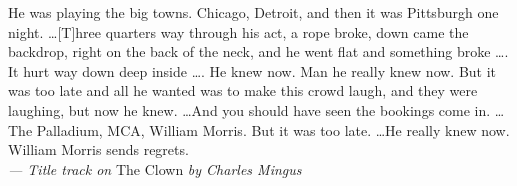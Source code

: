 %
%
%


%
%

\begin{flushright}
  \begin{minipage}[]{0.6\linewidth}
    \begin{flushright}
      He was playing the big towns. Chicago, Detroit, and then it was Pittsburgh
      one night. \dots [T]hree quarters way through his act, a rope broke, down
      came the backdrop, right on the back of the neck, and he went flat and
      something broke \dots . It hurt way down deep inside \dots . He knew
      now. Man he really knew now. But it was too late and all he wanted was to
      make this crowd laugh, and they were laughing, but now he knew. \dots And
      you should have seen the bookings come in. \dots The Palladium, MCA,
      William Morris. But it was too late. \dots He really knew now. William
      Morris sends regrets. \\{\small \emph{--- Title track on} The Clown
        \emph{by Charles Mingus}}
    \end{flushright}
  \end{minipage}
\end{flushright}
\vspace{\baselineskip}

